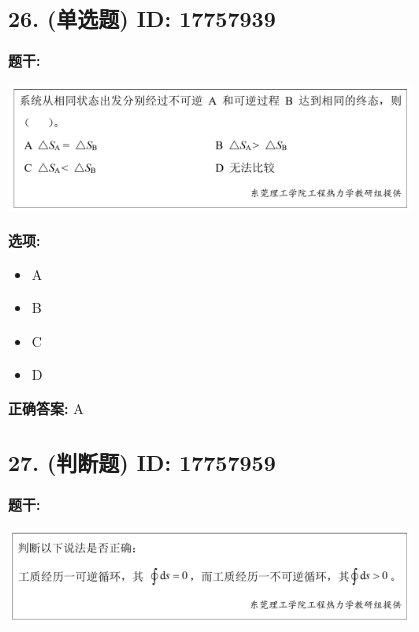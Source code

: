 \documentclass[12pt]{article}
\begin{document}
\vspace{0.5em}\hrulefill\vspace{1em}

\subsection*{26. (单选题) \small ID: 17757939}

\textbf{题干:}


\begin{center}\includegraphics[width=0.8\textwidth, height=0.25\textheight, keepaspectratio]{question_26_17757939/title_img_1.png}\end{center}

\textbf{选项:}
\begin{itemize}[leftmargin=*]
  \item A

  \item B

  \item C

  \item D

\end{itemize}

\textbf{正确答案:}
A

\vspace{0.5em}\hrulefill\vspace{1em}

\subsection*{27. (判断题) \small ID: 17757959}

\textbf{题干:}


\begin{center}\includegraphics[width=0.8\textwidth, height=0.25\textheight, keepaspectratio]{question_27_17757959/title_img_1.png}\end{center}
\end{document}
